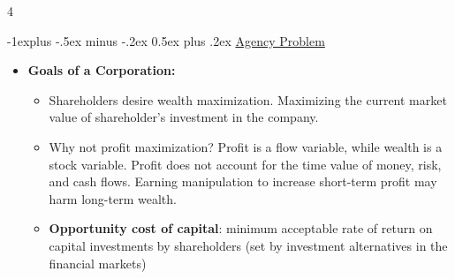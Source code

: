 \documentclass[10pt, landscape]{article}
\makeatletter
\renewcommand{\subsection}{\@startsection{subsection}{2}{0mm}%
  {-1explus -.5ex minus -.2ex}%
  {0.5ex plus .2ex}%
{\normalfont\normalsize\bfseries}}
\renewcommand{\subsubsection}{\@startsection{subsubsection}{3}{0mm}%
  {-1ex plus -.5ex minus -.2ex}%
  {1ex plus .2ex}%
{\normalfont\small\bfseries}}%
\makeatother
\begin{document}
\begin{multicols*}{4}

  \subsection{\underline{Agency Problem}}
  \begin{itemize}
    \item \textbf{Goals of a Corporation:}
      \begin{itemize}
        \item Shareholders desire wealth maximization. Maximizing the current market value of shareholder's investment in the company.
        \item Why not profit maximization? Profit is a flow variable, while wealth is a stock variable. Profit does not account for the time value of money, risk, and cash flows. Earning manipulation to increase short-term profit may harm long-term wealth.
        \item \textbf{Opportunity cost of capital}: minimum acceptable rate of return on capital investments by shareholders (set by investment alternatives in the financial markets)
      \end{itemize}


\end{itemize}
\end{multicols*}
\end{document}
